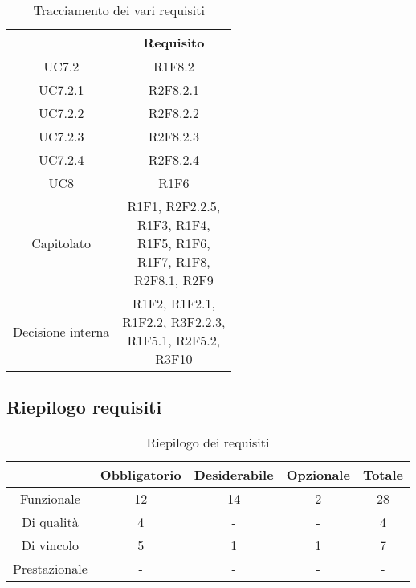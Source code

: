 \begin{table}[H]
	\centering
	\renewcommand{\arraystretch}{1.8}
	\begin{tabular}{c | c}
		\rowcolor[HTML]{125E28}
		\multicolumn{1}{c}{\color[HTML]{FFFFFF} \textbf{Fonte}} &
		\multicolumn{1}{c}{\color[HTML]{FFFFFF} \textbf{Requisito}} \\
		\hline
		UC7.2 & R1F8.2 \\ \hline
		UC7.2.1 & R2F8.2.1 \\ \hline
		UC7.2.2 & R2F8.2.2 \\ \hline
		UC7.2.3 & R2F8.2.3 \\ \hline
		UC7.2.4 & R2F8.2.4 \\ \hline
		UC8 & R1F6 \\ \hline
		Capitolato & \shortstack{R1F1, R2F2.2.5, \\R1F3, R1F4, \\R1F5, R1F6, \\R1F7, R1F8,\\ R2F8.1, R2F9}  \\ \hline
		Decisione interna & \shortstack{R1F2, R1F2.1,\\ R1F2.2, R3F2.2.3,\\ R1F5.1, R2F5.2,\\ R3F10} \\
	\end{tabular}
    \caption{Tracciamento dei vari requisiti}
\end{table}

\subsection{Riepilogo requisiti} \label{subsection: riepilogo}

\begin{table}[H]
    \centering
    \renewcommand{\arraystretch}{1.8}
    \begin{tabular}{c | c | c | c | c}
        \rowcolor[HTML]{125E28}
        \multicolumn{1}{c}{\color[HTML]{FFFFFF} \textbf{Tipologia}}          &
        \multicolumn{1}{c}{\color[HTML]{FFFFFF} \textbf{Obbligatorio}} &
        \multicolumn{1}{c}{\color[HTML]{FFFFFF} \textbf{Desiderabile}}     &
        \multicolumn{1}{c}{\color[HTML]{FFFFFF} \textbf{Opzionale}}     &
        \multicolumn{1}{c}{\color[HTML]{FFFFFF} \textbf{Totale}}                                                                                                                                             \\
        \hline
        Funzionale & 12 & 14 & 2 & 28 \\ \hline
        Di qualità & 4 & - & - & 4 \\ \hline
        Di vincolo & 5 & 1 & 1 & 7 \\ \hline
        Prestazionale & - & - & - & - \\ 
    \end{tabular}
    \caption{Riepilogo dei requisiti}
\end{table}